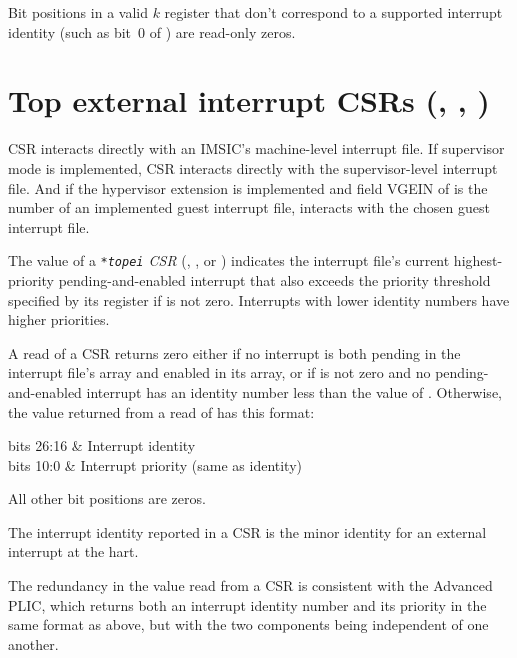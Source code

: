 Bit positions in a valid $k$ register that don't correspond
to a supported interrupt identity (such as bit~0 of ) are
read-only zeros.

\section{%
Top external interrupt CSRs (, , )%
}

CSR  interacts directly with
an IMSIC's machine-level interrupt file.
If supervisor mode is implemented, CSR  interacts
directly with the supervisor-level interrupt file.
And if the hypervisor extension is implemented and field VGEIN of
 is the number of an implemented guest interrupt file,
 interacts with the chosen guest interrupt file.

The value of a \emph{\texttt{*topei} CSR} (, , or
) indicates the interrupt file's current highest-priority
pending-and-enabled interrupt that also exceeds the priority threshold
specified by its  register if  is not
zero.
Interrupts with lower identity numbers have higher priorities.

A read of a  CSR returns zero either if no interrupt
is both pending in the interrupt file's  array and enabled
in its  array, or if  is not zero and no
pending-and-enabled interrupt has an identity number less than the
value of .
Otherwise, the value returned from a read of  has this
format:
\begin{displayLinesTable}[l@{\quad}l]
bits 26:16 & Interrupt identity \\
bits 10:0  & Interrupt priority (same as identity) \\
\end{displayLinesTable}
All other bit positions are zeros.

The interrupt identity reported in a  CSR is the minor
identity for an external interrupt at the hart.

\begin{commentary}
The redundancy in the value read from a  CSR is consistent
with the Advanced PLIC, which returns both an interrupt identity
number and its priority in the same format as above, but with the two
components being independent of one another.
\end{commentary}

